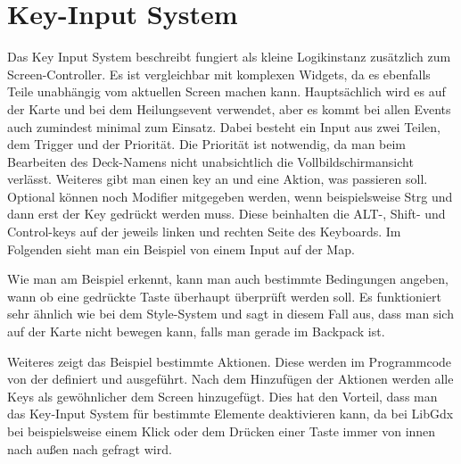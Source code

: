 
\renewcommand{\kapitelautor}{Autor: Felix Zwickelstorfer}
\section{Key-Input System}\label{sec:key-input-system}
\renewcommand{\kapitelautor}{Autor: Felix Zwickelstorfer}

Das Key Input System beschreibt fungiert als kleine Logikinstanz zusätzlich zum Screen-Controller.
Es ist vergleichbar mit komplexen Widgets, da es ebenfalls Teile unabhängig vom aktuellen Screen machen kann.
Hauptsächlich wird es auf der Karte und bei dem Heilungsevent verwendet, aber es kommt bei allen Events auch zumindest minimal zum Einsatz.
Dabei besteht ein Input aus zwei Teilen, dem Trigger und der Priorität.
Die Priorität ist notwendig, da man \zB beim Bearbeiten des Deck-Namens nicht unabsichtlich die Vollbildschirmansicht verlässt.
Weiteres gibt man einen key an und eine Aktion, was passieren soll.
Optional können noch Modifier mitgegeben werden, wenn beispielsweise Strg und dann erst der Key gedrückt werden muss.
Diese beinhalten die ALT-, Shift- und Control-keys auf der jeweils linken und rechten Seite des Keyboards.
Im Folgenden sieht man ein Beispiel von einem Input auf der Map.


Wie man am Beispiel erkennt, kann man auch bestimmte Bedingungen angeben, wann \bzw ob eine gedrückte Taste überhaupt überprüft werden soll.
Es funktioniert sehr ähnlich wie bei dem Style-System und sagt in diesem Fall aus, dass man sich auf der Karte nicht bewegen kann, falls man gerade im Backpack ist.

Weiteres zeigt das Beispiel bestimmte Aktionen.
Diese werden im Programmcode von der  definiert und ausgeführt.
Nach dem Hinzufügen der Aktionen werden alle Keys als gewöhnlicher  dem Screen hinzugefügt.
Dies hat den Vorteil, dass man das Key-Input System für bestimmte Elemente deaktivieren kann, da bei LibGdx bei beispielsweise einem Klick oder dem Drücken einer Taste immer von innen nach außen nach  gefragt wird.
